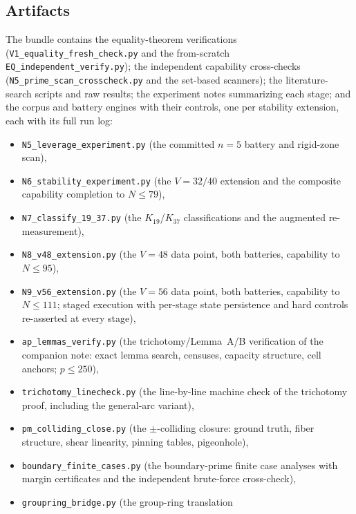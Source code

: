 \documentclass[11pt,a4paper]{article}
\numberwithin{equation}{section}
\theoremstyle{plain}
\theoremstyle{definition}
\theoremstyle{remark}
\begin{document}
\subsection{Artifacts}

\begingroup\sloppy
The bundle \cite{prog-artifacts} contains the equality-theorem
verifications (\texttt{V1\_equality\_fresh\_check.py} and the
from-scratch \texttt{EQ\_independent\_verify.py}); the independent
capability cross-checks (\texttt{N5\_prime\_scan\_crosscheck.py} and the
set-based scanners); the literature-search scripts and raw results; the
experiment notes summarizing each stage; and the corpus and battery
engines with their controls, one per stability extension, each with its
full run log:
\begin{itemize}[leftmargin=2.2em,itemsep=1pt,topsep=2pt]
  \item \texttt{N5\_leverage\_experiment.py} (the committed $n=5$
        battery and rigid-zone scan),
  \item \texttt{N6\_stability\_experiment.py} (the $V=32/40$ extension
        and the composite capability completion to $N\le79$),
  \item \texttt{N7\_classify\_19\_37.py} (the $K_{19}$/$K_{37}$
        classifications and the augmented re-measurement),
  \item \texttt{N8\_v48\_extension.py} (the $V=48$ data point, both
        batteries, capability to $N\le95$),
  \item \texttt{N9\_v56\_extension.py} (the $V=56$ data point, both
        batteries, capability to $N\le111$; staged execution with
        per-stage state persistence and hard controls re-asserted at
        every stage),
  \item \texttt{ap\_lemmas\_verify.py} (the trichotomy/Lemma~A/B
        verification of the companion note: exact lemma search,
        censuses, capacity structure, cell anchors; $p\le250$),
  \item \texttt{trichotomy\_linecheck.py} (the line-by-line machine
        check of the trichotomy proof, including the general-arc
        variant),
  \item \texttt{pm\_colliding\_close.py} (the $\pm$-colliding closure:
        ground truth, fiber structure, shear linearity, pinning tables,
        pigeonhole),
  \item \texttt{boundary\_finite\_cases.py} (the boundary-prime finite
        case analyses with margin certificates and the independent
        brute-force cross-check),
  \item \texttt{groupring\_bridge.py} (the group-ring translation

\end{itemize}
\end{document}
